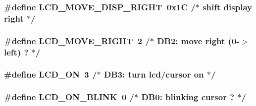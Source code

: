 \subsubsection[{\texorpdfstring{L\+C\+D\+\_\+\+M\+O\+V\+E\+\_\+\+D\+I\+S\+P\+\_\+\+R\+I\+G\+HT}{LCD_MOVE_DISP_RIGHT}}]{\setlength{\rightskip}{0pt plus 5cm}\#define L\+C\+D\+\_\+\+M\+O\+V\+E\+\_\+\+D\+I\+S\+P\+\_\+\+R\+I\+G\+HT~0x1\+C   /$\ast$ shift display right                    $\ast$/}\hypertarget{group__pfleury__lcd_ga9a90bb926f5ba59378af81fe8e246ffb}{}\label{group__pfleury__lcd_ga9a90bb926f5ba59378af81fe8e246ffb}
\subsubsection[{\texorpdfstring{L\+C\+D\+\_\+\+M\+O\+V\+E\+\_\+\+R\+I\+G\+HT}{LCD_MOVE_RIGHT}}]{\setlength{\rightskip}{0pt plus 5cm}\#define L\+C\+D\+\_\+\+M\+O\+V\+E\+\_\+\+R\+I\+G\+HT~2      /$\ast$   D\+B2\+: move right (0-\/$>$ left) ?      $\ast$/}\hypertarget{group__pfleury__lcd_ga97cdb19acf109ad52ab4994d2ad02cee}{}\label{group__pfleury__lcd_ga97cdb19acf109ad52ab4994d2ad02cee}
\subsubsection[{\texorpdfstring{L\+C\+D\+\_\+\+ON}{LCD_ON}}]{\setlength{\rightskip}{0pt plus 5cm}\#define L\+C\+D\+\_\+\+ON~3      /$\ast$ D\+B3\+: turn lcd/cursor on             $\ast$/}\hypertarget{group__pfleury__lcd_ga47a809dfec086fdeca93dedc4fb83b44}{}\label{group__pfleury__lcd_ga47a809dfec086fdeca93dedc4fb83b44}
\subsubsection[{\texorpdfstring{L\+C\+D\+\_\+\+O\+N\+\_\+\+B\+L\+I\+NK}{LCD_ON_BLINK}}]{\setlength{\rightskip}{0pt plus 5cm}\#define L\+C\+D\+\_\+\+O\+N\+\_\+\+B\+L\+I\+NK~0      /$\ast$     D\+B0\+: blinking cursor ?          $\ast$/}\hypertarget{group__pfleury__lcd_ga5d76592a978537acee615098ce4d80f5}{}\label{group__pfleury__lcd_ga5d76592a978537acee615098ce4d80f5}
